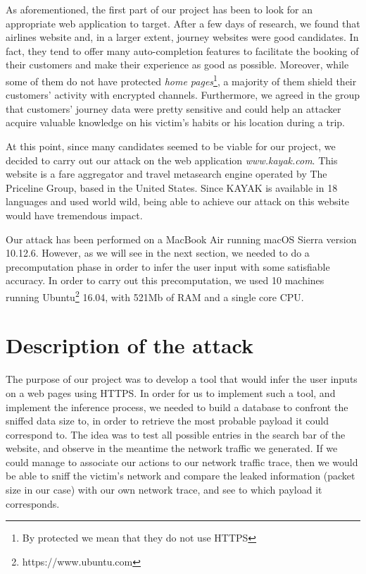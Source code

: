 \documentclass[journal]{IEEEtran}
\begin{document}
As aforementioned, the first part of our project has been to look for an appropriate web application to target. After a few days of research, we found that airlines website and, in a larger extent, journey websites were good candidates. In fact, they tend to offer many auto-completion features to facilitate the booking of their customers and make their experience as good as possible. Moreover, while some of them do not have protected \emph{home pages}\footnote{By protected we mean that they do not use HTTPS}, a majority of them shield their customers' activity with encrypted channels. Furthermore, we agreed in the group that customers' journey data were pretty sensitive and could help an attacker acquire valuable knowledge on his victim's habits or his location during a trip. 

\medskip

At this point, since many candidates seemed to be viable for our project, we decided to carry out our attack on the web application \emph{www.kayak.com}. This website is a fare aggregator and travel metasearch engine operated by The Priceline Group, based in the United States. Since KAYAK is available in 18 languages and used world wild, being able to achieve our attack on this website would have tremendous impact.

\medskip

Our attack has been performed on a MacBook Air running macOS Sierra version 10.12.6. However, as we will see in the next section, we needed to do a precomputation phase in order to infer the user input with some satisfiable accuracy. In order to carry out this precomputation, we used 10 machines running Ubuntu\footnote{https://www.ubuntu.com} 16.04, with 521Mb of RAM and a single core CPU.

\section{Description of the attack}

The purpose of our project was to develop a tool that would infer the user inputs on a web pages using HTTPS. In order for us to implement such a tool, and implement the inference process, we needed to build a database to confront the sniffed data size to, in order to retrieve the most probable payload it could correspond to. The idea was to test all possible entries in the search bar of the website, and observe in the meantime the network traffic we generated. If we could manage to associate our actions to our network traffic trace, then we would be able to sniff the victim's network and compare the leaked information (packet size in our case) with our own network trace, and see to which payload it corresponds.
\end{document}
